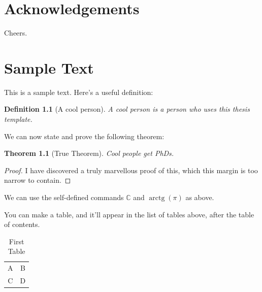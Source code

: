 \documentclass[a4paper, twoside]{report} %
\newtheorem{definition}{Definition}
\newtheorem{theorem}{Theorem}
\newcommand{\C}{\mathbb{C}}
\DeclareMathOperator{\arctg}{arctg}
\begin{document}

\newpage
\chapter*{Acknowledgements}
Cheers.


\newpage
\tableofcontents
\listoftables
\listoffigures


\newpage
\chapter{Sample Text}

This is a sample text. Here's a useful definition:
\begin{definition}[A cool person]
    A cool person is a person who uses this thesis template.
\end{definition}

We can now state and prove the following theorem:
\begin{theorem}[True Theorem]
    Cool people get PhDs.
\end{theorem}
\begin{proof}
    I have discovered a truly marvellous proof of this, which this margin is too narrow to contain.
\end{proof}

We can use the self-defined commands $\C$ and $\arctg(\pi)$ as above.

You can make a table, and it'll appear in the list of tables above, after the table of contents.

\begin{table}[h]
    \centering
    \begin{tabular}{c|c}
        A & B  \\
        C & D
    \end{tabular}
    \caption{First Table}
    \label{tab:first_table}
\end{table}
\end{document}
